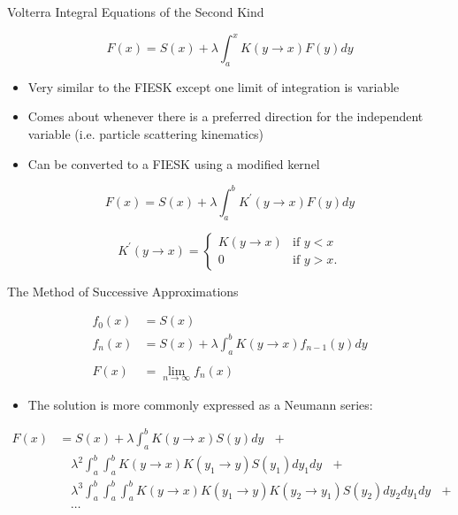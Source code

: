 \documentclass{beamer}
\begin{document}
\begin{frame}{Volterra Integral Equations of the Second Kind}

  \begin{equation*}
    F(x) = S(x) + \lambda \int_a^x K(y \to x) F(y) dy
  \end{equation*}

  \bigskip
  
  \begin{itemize}
    \item Very similar to the FIESK except one limit of integration is variable
      \medskip
    \item Comes about whenever there is a preferred direction for the 
      independent variable (i.e. particle scattering kinematics)
      \medskip
    \item Can be converted to a FIESK using a modified kernel
  \end{itemize}

  \begin{equation*}
    F(x) = S(x) + \lambda \int_a^b K^{'}(y \to x) F(y) dy \nonumber
  \end{equation*}
  
  \begin{equation*}
    K^{'}(y \to x) = 
    \begin{cases}
      K(y \to x) & \text{if }y < x \\
      0 & \text{if }y > x.
    \end{cases}
  \end{equation*}

\end{frame}

\begin{frame}{The Method of Successive Approximations}

  \begin{align}
    f_0(x) & = S(x) \nonumber \\
    f_n(x) & = S(x) + \lambda \int_a^b K(y \to x)f_{n-1}(y)dy \nonumber \\
    & \quad \nonumber \\
    F(x) & = \lim_{n \to \infty} f_n(x) \nonumber
  \end{align}

  \begin{itemize}
    \item The solution is more commonly expressed as a Neumann series:
  \end{itemize}
  \begin{align}
    F(x) & = S(x) + \lambda \int_a^b K(y \to x)S(y)dy \text{ }+ \nonumber \\
    & \quad \lambda^2 \int_a^b \int_a^b K(y \to x)K(y_1 \to y)S(y_1)dy_1dy 
    \text{ } + \nonumber \\
    & \quad \lambda^3 \int_a^b \int_a^b \int_a^b K(y \to x)K(y_1 \to y)
    K(y_2 \to y_1)S(y_2)dy_2dy_1dy \text{ }+ \nonumber \\
    & \quad \cdots \nonumber
  \end{align}
  
\end{frame}
\end{document}
